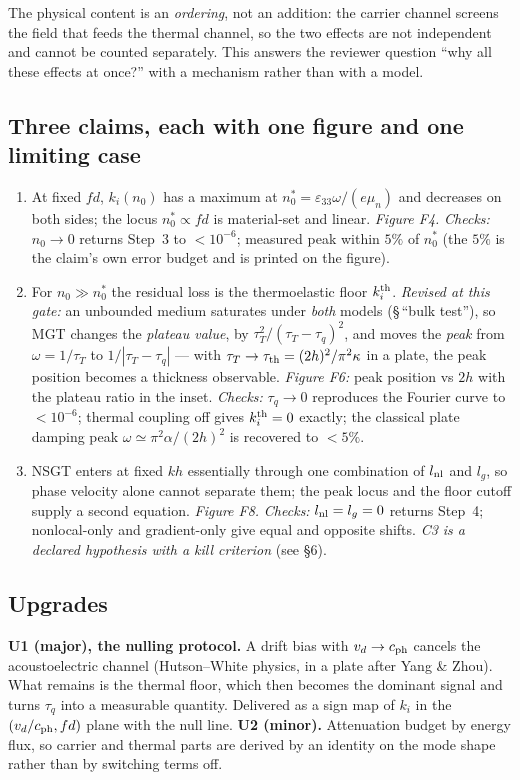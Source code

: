 \documentclass[11pt]{article}
\begin{document}
The physical content is an \emph{ordering}, not an addition: the carrier channel screens the field
that feeds the thermal channel, so the two effects are not independent and cannot be counted
separately. This answers the reviewer question ``why all these effects at once?'' with a mechanism
rather than with a model.

\subsection*{Three claims, each with one figure and one limiting case}
\begin{enumerate}\small
\item[\textbf{C1}] At fixed $fd$, $k_i(n_0)$ has a maximum at
$n_0^{*}=\varepsilon_{33}\omega/(e\mu_n)$ and decreases on both sides; the locus $n_0^{*}\propto fd$
is material-set and linear. \emph{Figure F4.}
\emph{Checks:} $n_0\to0$ returns Step~3 to $<10^{-6}$; measured peak within $5\%$ of $n_0^{*}$
(the $5\%$ is the claim's own error budget and is printed on the figure).
\item[\textbf{C2}] For $n_0\gg n_0^{*}$ the residual loss is the thermoelastic floor
$k_i^{\rm th}$. \emph{Revised at this gate:} an unbounded medium saturates under \emph{both} models
(\S\,``bulk test''), so MGT changes the \emph{plateau value}, by $\tau_T^2/(\tau_T-\tau_q)^2$, and
moves the \emph{peak} from $\omega=1/\tau_T$ to $1/|\tau_T-\tau_q|$ --- with $\tau_T\to\tau_{\rm th}
=(2h)^2/\pi^2\kappa$ in a plate, the peak position becomes a thickness observable.
\emph{Figure F6:} peak position vs $2h$ with the plateau ratio in the inset.
\emph{Checks:} $\tau_q\to0$ reproduces the Fourier curve to $<10^{-6}$; thermal coupling off gives
$k_i^{\rm th}=0$ exactly; the classical plate damping peak $\omega\simeq\pi^2\alpha/(2h)^2$ is
recovered to $<5\%$.
\item[\textbf{C3}] NSGT enters at fixed $kh$ essentially through one combination of $l_{\rm nl}$ and
$l_g$, so phase velocity alone cannot separate them; the peak locus and the floor cutoff supply a
second equation. \emph{Figure F8.}
\emph{Checks:} $l_{\rm nl}=l_g=0$ returns Step~4; nonlocal-only and gradient-only give equal and
opposite shifts. \emph{C3 is a declared hypothesis with a kill criterion} (see \S6).
\end{enumerate}

\subsection*{Upgrades}
\textbf{U1 (major), the nulling protocol.} A drift bias with $v_d\to c_{\rm ph}$ cancels the
acoustoelectric channel (Hutson--White physics, in a plate after Yang \& Zhou). What remains is the
thermal floor, which then becomes the dominant signal and turns $\tau_q$ into a measurable
quantity. Delivered as a sign map of $k_i$ in the $(v_d/c_{\rm ph},fd)$ plane with the null line.
\textbf{U2 (minor).} Attenuation budget by energy flux, so carrier and thermal parts are derived by
an identity on the mode shape rather than by switching terms off.
\end{document}
